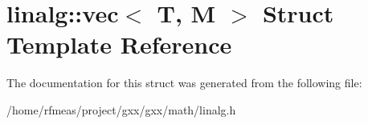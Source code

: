 \hypertarget{structlinalg_1_1vec}{}\section{linalg\+:\+:vec$<$ T, M $>$ Struct Template Reference}
\label{structlinalg_1_1vec}


The documentation for this struct was generated from the following file\+:\begin{DoxyCompactItemize}
\item 
/home/rfmeas/project/gxx/gxx/math/linalg.\+h\end{DoxyCompactItemize}
